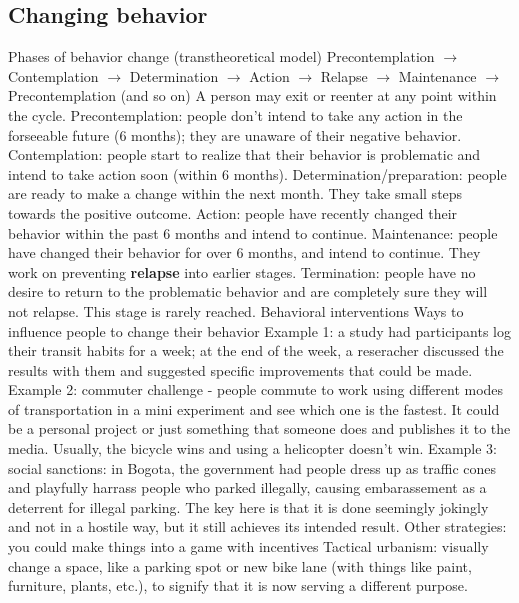 \documentclass{article}
\begin{document}
    \subsection{Changing behavior}
    \begin{outline}
        \1 Phases of behavior change (transtheoretical model)
            \2 Precontemplation $\to$ Contemplation $\to$ Determination $\to$ Action $\to$ Relapse $\to$ Maintenance $\to$ Precontemplation (and so on)
            \2 A person may exit or reenter at any point within the cycle. 
                \3 Precontemplation: people don't intend to take any action in the forseeable future (6 months); they are unaware of their negative behavior. 
                \3 Contemplation: people start to realize that their behavior is problematic and intend to take action soon (within 6 months). 
                \3 Determination/preparation: people are ready to make a change within the next month. They take small steps towards the positive outcome. 
                \3 Action: people have recently changed their behavior within the past 6 months and intend to continue. 
                \3 Maintenance: people have changed their behavior for over 6 months, and intend to continue. They work on preventing \textbf{relapse} into earlier stages. 
                \3 Termination: people have no desire to return to the problematic behavior and are completely sure they will not relapse. This stage is rarely reached. 
        \1 Behavioral interventions
            \2 Ways to influence people to change their behavior
            \2 Example 1: a study had participants log their transit habits for a week; at the end of the week, a reseracher discussed the results with them and suggested specific improvements that could be made. 
            \2 Example 2: commuter challenge - people commute to work using different modes of transportation in a mini experiment and see which one is the fastest. It could be a personal project or just something that someone does and publishes it to the media. Usually, the bicycle wins and using a helicopter doesn't win. 
            \2 Example 3: social sanctions: in Bogota, the government had people dress up as traffic cones and playfully harrass people who parked illegally, causing embarassement as a deterrent for illegal parking. The key here is that it is done seemingly jokingly and not in a hostile way, but it still achieves its intended result. 
            \2 Other strategies: you could make things into a game with incentives
            \2 Tactical urbanism: visually change a space, like a parking spot or new bike lane (with things like paint, furniture, plants, etc.), to signify that it is now serving a different purpose. 
    \end{outline}
\end{document}
